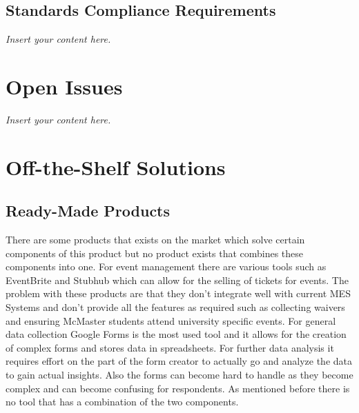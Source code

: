 \documentclass[12pt]{article}
\newcommand{\lips}{\textit{Insert your content here.}}
\begin{document}
\subsection{Standards Compliance Requirements}
\lips

\section{Open Issues}
\lips
\section{Off-the-Shelf Solutions}
\subsection{Ready-Made Products}
There are some products that exists on the market which solve certain components of this product but no product exists that combines these components into one. For event management there are various tools such as EventBrite and Stubhub which can allow for the selling of tickets for events. The problem with these products are that they don't integrate well with current MES Systems and don't provide all the features as required such as collecting waivers and ensuring McMaster students attend university specific events. For general data collection Google Forms is the most used tool and it allows for the creation of complex forms and stores data in spreadsheets. For further data analysis it requires effort on the part of the form creator to actually go and analyze the data to gain actual insights. Also the forms can become hard to handle as they become complex and can become confusing for respondents. As mentioned before there is no tool that has a combination of the two components.
\end{document}
